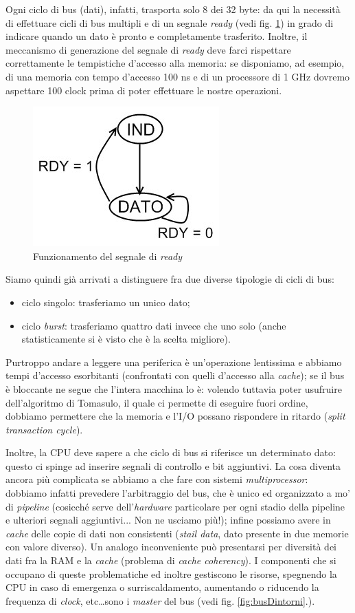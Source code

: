 Ogni ciclo di bus (dati), infatti, trasporta solo 8 dei 32 byte: da qui la necessità di effettuare cicli di bus multipli e di un segnale \textit{ready} (vedi fig. \ref{fig:segnaleReady}) in grado di indicare quando un dato è pronto e completamente trasferito. Inoltre, il meccanismo di generazione del segnale di \textit{ready} deve farci rispettare correttamente le tempistiche d'accesso alla memoria: se disponiamo, ad esempio, di una memoria con tempo d'accesso 100 ns e di un processore di 1 GHz dovremo aspettare 100 clock prima di poter effettuare le nostre operazioni.

\begin{figure}[!h]
\centering
\includegraphics[width=0.35\columnwidth]{img/segnaleReady}
\caption{Funzionamento del segnale di \textit{ready}}
\label{fig:segnaleReady}
\end{figure}

Siamo quindi già arrivati a distinguere fra due diverse tipologie di cicli di bus:
\begin{itemize}
\item ciclo singolo: trasferiamo un unico dato;
\item ciclo \textit{burst}: trasferiamo quattro dati invece che uno solo (anche statisticamente si è visto che è la scelta migliore).
\end{itemize}
Purtroppo andare a leggere una periferica è un'operazione lentissima e abbiamo tempi d'accesso esorbitanti (confrontati con quelli d'accesso alla \textit{cache}); se il bus è bloccante ne segue che l'intera macchina lo è: volendo tuttavia poter usufruire dell'algoritmo di Tomasulo, il quale ci permette di eseguire fuori ordine, dobbiamo permettere che la memoria e l'I/O possano rispondere in ritardo (\textit{split transaction cycle}).

Inoltre, la CPU deve sapere a che ciclo di bus si riferisce un determinato dato: questo ci spinge ad inserire segnali di controllo e bit aggiuntivi. La cosa diventa ancora più complicata se abbiamo a che fare con sistemi \textit{multiprocessor}: dobbiamo infatti prevedere l'arbitraggio del bus, che è unico ed organizzato a mo' di \textit{pipeline} (cosicché serve dell'\textit{hardware} particolare per ogni stadio della pipeline e ulteriori segnali aggiuntivi... Non ne usciamo più!); infine possiamo avere in \textit{cache} delle copie di dati non consistenti (\textit{stail data}, dato presente in due memorie con valore diverso). Un analogo inconveniente può presentarsi per diversità dei dati fra la RAM e la \textit{cache} (problema di \textit{cache coherency}).
I componenti che si occupano di queste problematiche ed inoltre gestiscono le risorse, spegnendo la CPU in caso di emergenza o surriscaldamento, aumentando o riducendo la frequenza di \textit{clock}, etc\ldots sono i \textit{master} del bus (vedi fig. \ref{fig:busDintorni}.).

